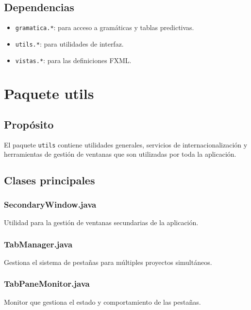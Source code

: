 \subsection{Dependencias}

\begin{itemize}
    \item \texttt{gramatica.*}: para acceso a gramáticas y tablas predictivas.
    \item \texttt{utils.*}: para utilidades de interfaz.
    \item \texttt{vistas.*}: para las definiciones FXML.
\end{itemize}

\section{Paquete utils}

\subsection{Propósito}

El paquete \texttt{utils} contiene utilidades generales, servicios de internacionalización y herramientas de gestión de ventanas que son utilizadas por toda la aplicación.

\subsection{Clases principales}

\subsubsection{SecondaryWindow.java}

Utilidad para la gestión de ventanas secundarias de la aplicación.

\subsubsection{TabManager.java}

Gestiona el sistema de pestañas para múltiples proyectos simultáneos.

\subsubsection{TabPaneMonitor.java}

Monitor que gestiona el estado y comportamiento de las pestañas.

